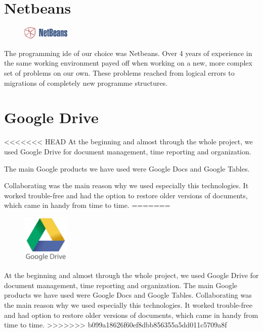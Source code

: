 \section{Netbeans}
\begin{figure}
  \begin{center}
    \includegraphics[width=0.2\textwidth] {bilder/NetBeans}
  \end{center}
\end{figure}
The programming \gls{ide} of our choice was Netbeans. Over 4 years of experience in the same working environment payed off when working on a new, more complex set of problems on our own. These problems reached from logical errors to migrations of completely new programme structures. 
\section{Google Drive}
<<<<<<< HEAD
At the beginning and almost through the whole project, we used Google Drive for document management, time reporting and organization.

The main Google products we have used were Google Docs and Google Tables.

Collaborating was the main reason why we used especially this technologies. It worked trouble-free and had the option to restore older versions of documents, which came in handy from time to time.
=======
\begin{figure}
  \begin{center}
    \includegraphics[width=0.2\textwidth] {bilder/googledrive}
  \end{center}
\end{figure}
At the beginning and almost through the whole project, we used Google Drive for document management, time reporting and organization.\newline
The main Google products we have used were Google Docs and Google Tables.\newline
Collaborating was the main reason why we used especially this technologies. It worked trouble-free and had option to restore older versions of documents, which came in handy from time to time.
>>>>>>> b099a18626f60ef8dbb856355a5dd011c5709a8f
